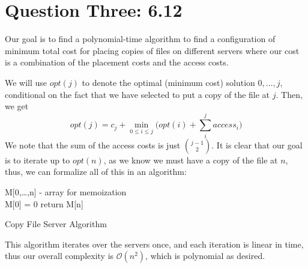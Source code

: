 \documentclass[11pt,letterpaper]{article}
\begin{document}
\section*{Question Three: 6.12}
Our goal is to find a polynomial-time algorithm to find a configuration of minimum total cost for placing copies of files on different servers where our cost is a combination of the placement costs and the access costs. 

We will use $opt(j)$ to denote the optimal (minimum cost) solution $0, \ldots, j$, conditional on the fact that we have selected to put a copy of the file at $j$. Then, we get 
\begin{equation*}
	opt(j) = c_j + \min_{0 \leq i \leq j} \Big( opt(i) + \sum_i^j access_i   \Big)
\end{equation*}
We note that the sum of the access costs is just $\binom{j-1}{2}$. It is clear that our goal is to iterate up to $opt(n)$, as we know we must have a copy of the file at $n$, thus, we can formalize all of this in an algorithm:

\vspace{5mm}
\begin{algorithm}[H]
	M[0,\ldots,n] - array for memoization \\
	M[0] = 0 \;
	return M[n]
	\caption{Copy File Server Algorithm}
\end{algorithm}
\vspace{5mm}

This algorithm iterates over the servers once, and each iteration is linear in time, thus our overall complexity is $\mathcal{O}(n^2)$, which is polynomial as desired. 
\end{document}
